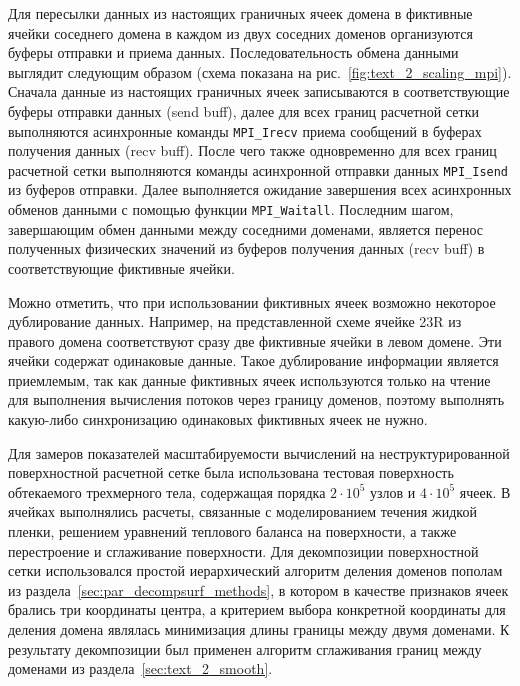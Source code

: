 Для пересылки данных из настоящих граничных ячеек домена в фиктивные ячейки соседнего домена в каждом из двух соседних доменов организуются буферы отправки и приема данных.
Последовательность обмена данными выглядит следующим образом (схема показана на рис.~\ref{fig:text_2_scaling_mpi}).
Сначала данные из настоящих граничных ячеек записываются в соответствующие буферы отправки данных (send buff), далее для всех границ расчетной сетки выполняются асинхронные команды \texttt{MPI\_Irecv} приема сообщений в буферах получения данных (recv buff).
После чего также одновременно для всех границ расчетной сетки выполняются команды асинхронной отправки данных \texttt{MPI\_Isend} из буферов отправки.
Далее выполняется ожидание завершения всех асинхронных обменов данными с помощью функции \texttt{MPI\_Waitall}.
Последним шагом, завершающим обмен данными между соседними доменами, является перенос полученных физических значений из буферов получения данных (recv buff) в соответствующие фиктивные ячейки.

Можно отметить, что при использовании фиктивных ячеек возможно некоторое дублирование данных.
Например, на представленной схеме ячейке 23R из правого домена соответствуют сразу две фиктивные ячейки в левом домене.
Эти ячейки содержат одинаковые данные.
Такое дублирование информации является приемлемым, так как данные фиктивных ячеек используются только на чтение для выполнения вычисления потоков через границу доменов, поэтому выполнять какую-либо синхронизацию одинаковых фиктивных ячеек не нужно.

Для замеров показателей масштабируемости вычислений на неструктурированной поверхностной расчетной сетке была использована тестовая поверхность обтекаемого трехмерного тела, содержащая порядка $2 \cdot 10^5$ узлов и $4 \cdot 10^5$ ячеек.
В ячейках выполнялись расчеты, связанные с моделированием течения жидкой пленки, решением уравнений теплового баланса на поверхности, а также перестроение и сглаживание поверхности.
Для декомпозиции поверхностной сетки использовался простой иерархический алгоритм деления доменов пополам из раздела~\ref{sec:par_decompsurf_methods}, в котором в качестве признаков ячеек брались три координаты центра, а критерием выбора конкретной координаты для деления домена являлась минимизация длины границы между двумя доменами.
К результату декомпозиции был применен алгоритм сглаживания границ между доменами из раздела~\ref{sec:text_2_smooth}.

